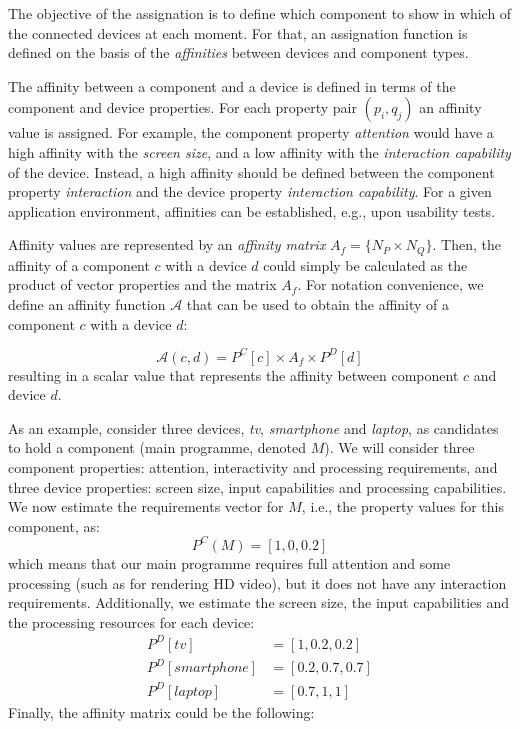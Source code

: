 The objective of the assignation is to define which component to show in which of the connected devices at each moment. 
For that, an assignation function is defined on the basis of the \emph{affinities} between devices and component types.

The affinity between a component and a device is defined in terms of the component and device properties. 
For each property pair $(p_i, q_j)$ an affinity value is assigned. 
For example, the component property \emph{attention} would have a high affinity with the \emph{screen size}, and a low affinity with the \emph{interaction capability} of the device. 
Instead, a high affinity should be defined between the component property \emph{interaction} and the device property \emph{interaction capability}.
For a given application environment, affinities can be established, e.g., upon usability tests. 

Affinity values are represented by an \emph{affinity matrix} $A_{f}=\{N_P \times N_Q\}$.
Then, the affinity of a component $c$ with a device $d$ could simply be calculated as the product of vector properties and the matrix $A_f$.
For notation convenience, we define an affinity function $\mathcal{A}$ that can be used to obtain the affinity of a component $c$ with a device $d$:

\begin{equation} \label{Eq:affinity}
\mathcal{A}(c,d) =P^C[c] \times A_{f} \times P^D[d]
\end{equation}
resulting in a scalar value that represents the affinity between component $c$ and device $d$.

As an example, consider three devices, \emph{tv}, \emph{smartphone} and \emph{laptop}, as candidates to hold a component (main programme, denoted $M$). 
We will consider three component properties: attention, interactivity and processing requirements, and three device  properties: screen size, input capabilities and processing capabilities.
We now estimate the requirements vector for $M$, i.e., the property values for this component, as:
\begin{equation} \label{Eq:PM}
P^C(M)=[1,0,0.2]
\end{equation}
which means that our main programme requires full attention and some processing (such as for rendering HD video), but it does not have any interaction requirements.
Additionally, we estimate the screen size, the input capabilities and the processing resources for each device:
\begin{equation} \label{Eq:PD}
\begin{split}
P^D[tv] & = [1, 0.2, 0.2] \\
P^D[smartphone] & = [0.2, 0.7,0.7] \\
P^D[laptop] & = [0.7, 1, 1]
\end{split}
\end{equation}
Finally, the affinity matrix could be the following:

